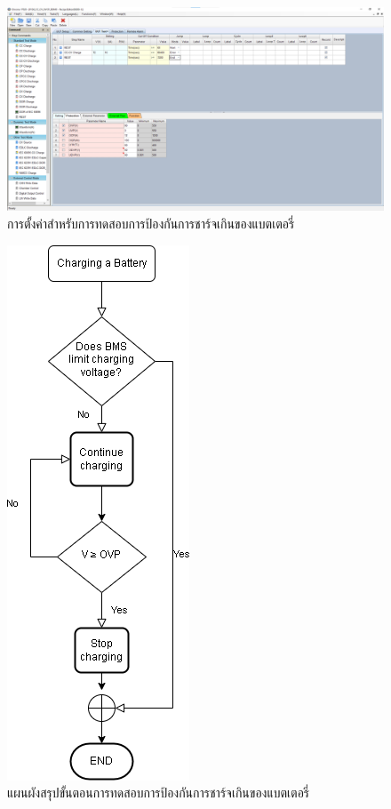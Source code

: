 \begin{center}
	\begin{figure}[H]
		\includegraphics[width=1\linewidth]{Chapters/img/R136_DEMO/UUT_TEST_OVCP.png}
		\centering
		\captionsetup{justification=centering,margin=2cm}
		\caption{การตั้งค่าสำหรับการทดสอบการป้องกันการชาร์จเกินของแบตเตอรี่}
		\label{fig:setting_charge}
	\end{figure}
	\begin{figure}[H]
		\includegraphics[width=0.25\linewidth]{Chapters/img/R136_DEMO/Charging_flow_chart.png}
		\centering
		\captionsetup{justification=centering,margin=2cm}
		\caption{แผนผังสรุปขั้นตอนการทดสอบการป้องกันการชาร์จเกินของแบตเตอรี่}
	\end{figure}
\end{center}

